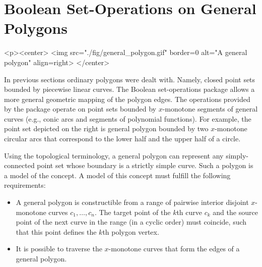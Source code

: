 \section{Boolean Set-Operations on General Polygons}
\label{bso_sec:bso_gen}

\lcTex{%
  \setlength{\widthRight}{1.4cm}
  \setlength{\widthLeft}{\widthLineReal}
  \addtolength{\widthLeft}{-\widthRight}
  \begin{minipage}{\widthLeft}
}
\label{fig:general_polygon}
\begin{ccHtmlOnly}
  <p><center>
    <img src="./fig/general_polygon.gif" border=0 alt="A general polygon" align=right>
  </center>
\end{ccHtmlOnly}
In previous sections ordinary polygons were dealt with. Namely, closed
point sets bounded by piecewise linear curves. The Boolean
set-operations package allows a more general geometric mapping of the
polygon edges. The operations provided by the package operate on point
sets bounded by $x$-monotone segments of general curves (e.g., conic
arcs and segments of polynomial functions). For example, the point set
depicted on the right is general polygon bounded by two $x$-monotone
circular arcs that correspond to the lower half and the upper half of
a circle.

Using the topological terminology, a general polygon can represent any
simply-connected point set whose boundary is a strictly simple curve.
Such a polygon is a model of the  concept. A model
of this concept must fulfill the following requirements:
\begin{itemize}
\item A general polygon is constructible from a range of pairwise
interior disjoint $x$-monotone curves $c_1, \ldots, c_n$. The target
point of the $k$th curve $c_k$ and the source point of the next curve
in the range (in a cyclic order) must coincide, such that this point
defines the $k$th polygon vertex. 
\item It is possible to traverse the $x$-monotone curves that form the
edges of a general polygon.
\end{itemize}

